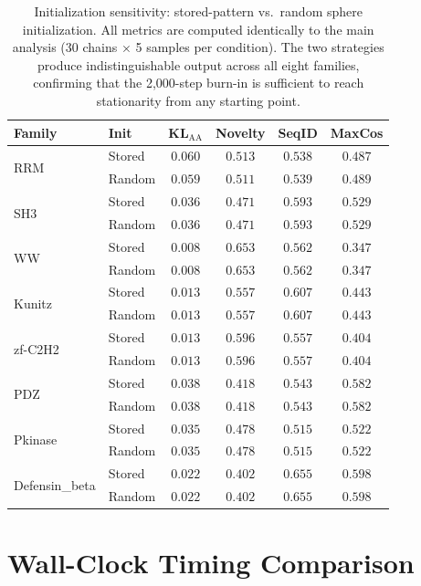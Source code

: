 \begin{table}[ht]
\centering
\caption{Initialization sensitivity: stored-pattern vs.\ random sphere initialization. All metrics are computed identically to the main analysis (30 chains $\times$ 5 samples per condition). The two strategies produce indistinguishable output across all eight families, confirming that the 2{,}000-step burn-in is sufficient to reach stationarity from any starting point.}
\label{tab:random-init}
\small
\begin{tabular}{@{}llcccc@{}}
\toprule
Family & Init & KL$_{\mathrm{AA}}$ & Novelty & SeqID & MaxCos \\
\midrule
\multirow{2}{*}{RRM}
 & Stored & $0.060$ & $0.513$ & $0.538$ & $0.487$ \\
 & Random & $0.059$ & $0.511$ & $0.539$ & $0.489$ \\
\midrule
\multirow{2}{*}{SH3}
 & Stored & $0.036$ & $0.471$ & $0.593$ & $0.529$ \\
 & Random & $0.036$ & $0.471$ & $0.593$ & $0.529$ \\
\midrule
\multirow{2}{*}{WW}
 & Stored & $0.008$ & $0.653$ & $0.562$ & $0.347$ \\
 & Random & $0.008$ & $0.653$ & $0.562$ & $0.347$ \\
\midrule
\multirow{2}{*}{Kunitz}
 & Stored & $0.013$ & $0.557$ & $0.607$ & $0.443$ \\
 & Random & $0.013$ & $0.557$ & $0.607$ & $0.443$ \\
\midrule
\multirow{2}{*}{zf-C2H2}
 & Stored & $0.013$ & $0.596$ & $0.557$ & $0.404$ \\
 & Random & $0.013$ & $0.596$ & $0.557$ & $0.404$ \\
\midrule
\multirow{2}{*}{PDZ}
 & Stored & $0.038$ & $0.418$ & $0.543$ & $0.582$ \\
 & Random & $0.038$ & $0.418$ & $0.543$ & $0.582$ \\
\midrule
\multirow{2}{*}{Pkinase}
 & Stored & $0.035$ & $0.478$ & $0.515$ & $0.522$ \\
 & Random & $0.035$ & $0.478$ & $0.515$ & $0.522$ \\
\midrule
\multirow{2}{*}{Defensin\_beta}
 & Stored & $0.022$ & $0.402$ & $0.655$ & $0.598$ \\
 & Random & $0.022$ & $0.402$ & $0.655$ & $0.598$ \\
\bottomrule
\end{tabular}
\end{table}

\section{Wall-Clock Timing Comparison}\label{si:timing}

